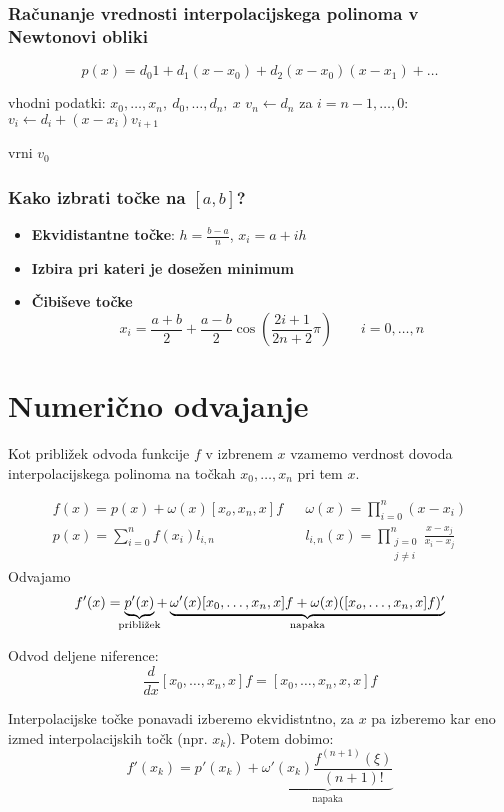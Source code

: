 \begin{multicols}{5}
\subsubsection*{Računanje vrednosti interpolacijskega polinoma v Newtonovi obliki}
\[ p(x) = d_0 1 + d_1(x-x_0) + d_2(x-x_0)(x-x_1) + \dots \]

\begin{koda}
vhodni podatki: $x_0, \dots, x_n, \ d_0, \dots, d_n, \ x$
$v_n \leftarrow d_n$
za $i = n-1, \dots, 0$:
    $v_i \leftarrow d_i + (x-x_i) v_{i+1}$

vrni $v_0$
\end{koda}

\subsubsection*{Kako izbrati točke na $[a,b]$?}
\begin{itemize}
    \item \textbf{Ekvidistantne točke}: $h = \frac{b-a}{n}$, $x_i = a + ih$
    \item \textbf{Izbira pri kateri je dosežen minimum}
    \item \textbf{Čibiševe točke}
    \[ x_i = \frac{a+b}{2} + \frac{a-b}{2}\cos\left(\frac{2i+1}{2n+2} \pi\right) \qquad i = 0, \dots, n\]
\end{itemize}


\section*{Numerično odvajanje}
Kot približek odvoda funkcije $f$ v izbrenem $x$ vzamemo verdnost dovoda interpolacijskega
polinoma na točkah $x_0, \dots, x_n$ pri tem $x$.

\begin{align*}
    f(x) = p(x) + \omega(x)[x_o, x_n, x]f && \omega(x) = \prod_{i=0}^n (x-x_i) \\
    p(x) = \sum_{i=0}^n f(x_i) l_{i,n} && l_{i,n}(x) = \prod_{\substack{j=0 \\ j \neq i}}^n \frac{x-x_j}{x_i - x_j}
\end{align*}
Odvajamo 
\[
f'(x) = 
\underbrace{p'(x)}_{\mathclap{\text{približek}}} + 
\underbrace{\omega'(x)[x_0, \dots, x_n, x] f + \omega(x)([x_o, \dots, x_n, x] f)'}_{\text{napaka}}
\]

Odvod deljene niference:
\[ \frac{d}{dx} [x_0, \dots, x_n, x] f = [x_0, \dots, x_n, x, x] f\]

Interpolacijske točke ponavadi izberemo ekvidistntno, za $x$ pa izberemo kar eno izmed
interpolacijskih točk (npr. $x_k$). Potem dobimo:
\[ 
    f'(x_k) = p'(x_k) + 
    \underbrace{\omega'(x_k) \frac{f^{(n+1)}(\xi)}{(n+1)!}}_{\text{napaka}}
\]


\end{multicols}
